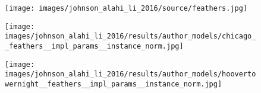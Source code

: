 \begin{figure}[H]
	\begin{minipage}[t]{0.3\textwidth}
		\centering
		\texttt{[image: images/johnson\_alahi\_li\_2016/source/feathers.jpg]}
	\end{minipage}
	\hfill%
	\begin{minipage}[t]{0.3\textwidth}
		\centering
		\texttt{[image: images/johnson\_alahi\_li\_2016/results/author\_models/chicago\_\_feathers\_\_impl\_params\_\_instance\_norm.jpg]}
	\end{minipage}
	\hfill%
	\begin{minipage}[t]{0.3\textwidth}
		\centering
		\texttt{[image: images/johnson\_alahi\_li\_2016/results/author\_models/hoovertowernight\_\_feathers\_\_impl\_params\_\_instance\_norm.jpg]}
	\end{minipage}
	

\end{figure}
